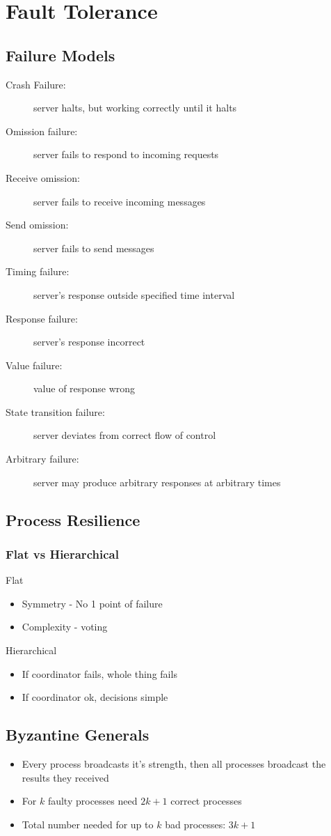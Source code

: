 \section{Fault Tolerance}
\subsection{Failure Models}
\begin{description}
	\item[Crash Failure:] server halts, but working correctly until it halts
	\item[Omission failure:] server fails to respond to incoming requests
	\item[Receive omission:] server fails to receive incoming messages
	\item[Send omission:] server fails to send messages
	\item[Timing failure:] server's response outside specified time interval
	\item[Response failure:] server's response incorrect
	\item[Value failure:] value of response wrong
	\item[State transition failure:] server deviates from correct flow of control
	\item[Arbitrary failure:] server may produce arbitrary responses at arbitrary times	
\end{description}

\subsection{Process Resilience}
\subsubsection{Flat vs Hierarchical}
Flat
\begin{itemize}
	\item Symmetry - No 1 point of failure
	\item Complexity - voting	
\end{itemize}
Hierarchical
\begin{itemize}
	\item If coordinator fails, whole thing fails
	\item If coordinator ok, decisions simple	
\end{itemize}

\subsection{Byzantine Generals}
\begin{itemize}
	\item Every process broadcasts it's strength, then all processes broadcast the results they received
	\item For $k$ faulty processes need $2k+1$ correct processes
	\item Total number needed for up to $k$ bad processes: $3k+1$	
\end{itemize}

